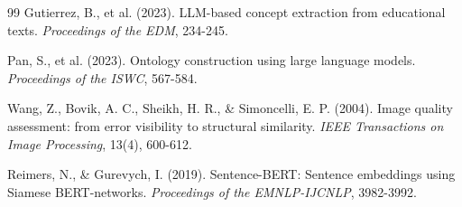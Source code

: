 \documentclass[12pt,a4paper]{article}
\begin{document}
\begin{thebibliography}{99}
Gutierrez, B., et al. (2023). LLM-based concept extraction from educational texts. \textit{Proceedings of the EDM}, 234-245.

Pan, S., et al. (2023). Ontology construction using large language models. \textit{Proceedings of the ISWC}, 567-584.

Wang, Z., Bovik, A. C., Sheikh, H. R., \& Simoncelli, E. P. (2004). Image quality assessment: from error visibility to structural similarity. \textit{IEEE Transactions on Image Processing}, 13(4), 600-612.

Reimers, N., \& Gurevych, I. (2019). Sentence-BERT: Sentence embeddings using Siamese BERT-networks. \textit{Proceedings of the EMNLP-IJCNLP}, 3982-3992.

\end{thebibliography}
\end{document}
